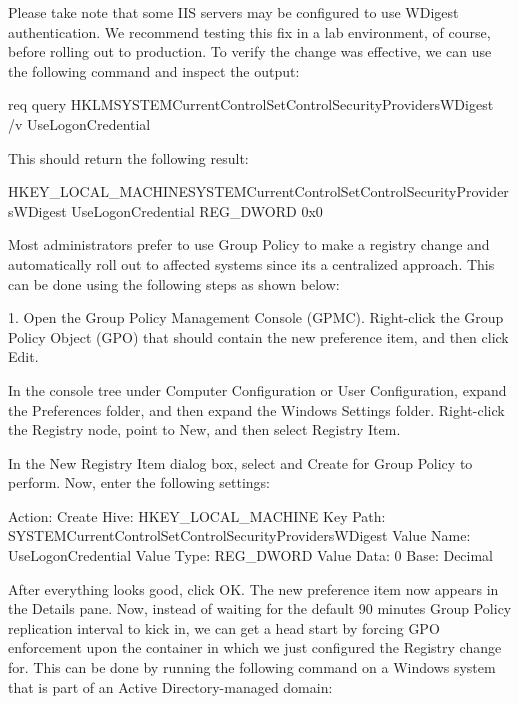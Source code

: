 Please take note that some IIS servers may be configured to use WDigest authentication. We recommend testing this fix in a lab environment, of course, before rolling out to production.
To verify the change was effective, we can use the following command and inspect the output:

req query HKLMSYSTEMCurrentControlSetControlSecurityProvidersWDigest /v UseLogonCredential

This should return the following result:

HKEY\_LOCAL\_MACHINESYSTEMCurrentControlSetControlSecurityProvidersWDigest UseLogonCredential REG\_DWORD 0x0

Most administrators prefer to use Group Policy to make a registry change and automatically roll out to affected systems since its a centralized approach. This can be done using the following steps as shown below:

1. Open the Group Policy Management Console (GPMC). Right-click the Group Policy Object (GPO) that should contain the new preference item, and then click Edit.

In the console tree under Computer Configuration or User Configuration, expand the Preferences folder, and then expand the Windows Settings folder. Right-click the Registry node, point to New, and then select Registry Item.

In the New Registry Item dialog box, select and Create for Group Policy to perform. Now, enter the following settings:

Action: Create
Hive: HKEY\_LOCAL\_MACHINE
Key Path: SYSTEMCurrentControlSetControlSecurityProvidersWDigest
Value Name: UseLogonCredential
Value Type: REG\_DWORD
Value Data: 0
Base: Decimal

After everything looks good, click OK. The new preference item now appears in the Details pane. Now, instead of waiting for the default 90 minutes Group Policy replication interval to kick in, we can get a head start by forcing GPO enforcement upon the container in which we just configured the Registry change for. This can be done by running the following command on a Windows system that is part of an Active Directory-managed domain:

